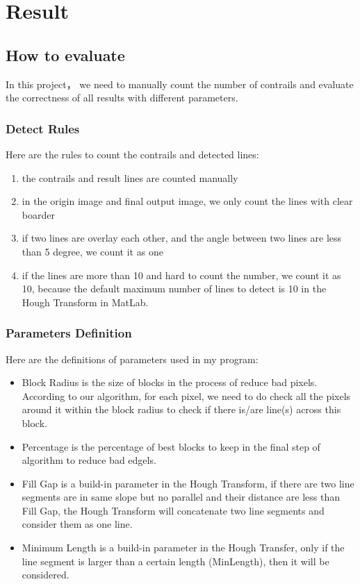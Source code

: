 \chapter{Result}

\section{How to evaluate}
In this project， we need to manually count the number of contrails and evaluate the correctness of all results with different parameters. \\

\subsection{Detect Rules}
Here are the rules to count the contrails and detected lines:\\
\begin{enumerate}
    \item the contrails and result lines are counted manually
    \item in the origin image and final output image, we only count the lines with clear boarder
    \item if two lines are overlay each other, and the angle between two lines are less than 5 degree, we count it as one
    \item if the lines are more than 10 and hard to count the number, we count it as 10, because the default maximum number of lines to detect is 10 in the Hough Transform in MatLab.
\end{enumerate}

\subsection{Parameters Definition}
Here are the definitions of parameters used in my program:
\begin{itemize}
    \item Block Radius is the size of blocks in the process of reduce bad pixels. According to our algorithm, for each pixel, we need to do check all the pixels around it within the block radius to check if there is/are line(s) across this block.\\
    \item Percentage is the percentage of best blocks to keep in the final step of algorithm to reduce bad edgels. \\
    \item Fill Gap is a build-in parameter in the Hough Transform, if there are two line segments are in same slope but no parallel and their distance are less than Fill Gap, the Hough Transform will concatenate two line segments and consider them as one line.\\
    \item Minimum Length is a build-in parameter in the Hough Transfer, only if the line segment is larger than a certain length (MinLength), then it will be considered. \\
\end{itemize}


